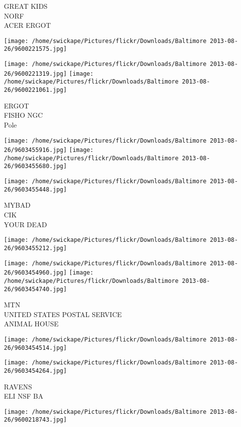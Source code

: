 \documentclass[10pt,letterpaper]{article}
\begin{document}
GREAT KIDS\\
NORF\\
ACER ERGOT
\pagebreak

\texttt{[image: /home/swickape/Pictures/flickr/Downloads/Baltimore 2013-08-26/9600221575.jpg]}

\vspace{0.25in}
\texttt{[image: /home/swickape/Pictures/flickr/Downloads/Baltimore 2013-08-26/9600221319.jpg]}
\texttt{[image: /home/swickape/Pictures/flickr/Downloads/Baltimore 2013-08-26/9600221061.jpg]}

ERGOT\\
FISHO NGC\\
Pole
\pagebreak

\texttt{[image: /home/swickape/Pictures/flickr/Downloads/Baltimore 2013-08-26/9603455916.jpg]}
\texttt{[image: /home/swickape/Pictures/flickr/Downloads/Baltimore 2013-08-26/9603455680.jpg]}

\texttt{[image: /home/swickape/Pictures/flickr/Downloads/Baltimore 2013-08-26/9603455448.jpg]}

MYBAD\\
CIK\\
YOUR DEAD
\pagebreak

\texttt{[image: /home/swickape/Pictures/flickr/Downloads/Baltimore 2013-08-26/9603455212.jpg]}

\vspace{0.25in}
\texttt{[image: /home/swickape/Pictures/flickr/Downloads/Baltimore 2013-08-26/9603454960.jpg]}
\texttt{[image: /home/swickape/Pictures/flickr/Downloads/Baltimore 2013-08-26/9603454740.jpg]}

MTN\\
UNITED STATES POSTAL SERVICE\\
ANIMAL HOUSE
\pagebreak

\texttt{[image: /home/swickape/Pictures/flickr/Downloads/Baltimore 2013-08-26/9603454514.jpg]}

\vspace{0.25in}
\texttt{[image: /home/swickape/Pictures/flickr/Downloads/Baltimore 2013-08-26/9603454264.jpg]}

RAVENS\\
ELI NSF BA
\pagebreak

\texttt{[image: /home/swickape/Pictures/flickr/Downloads/Baltimore 2013-08-26/9600218743.jpg]}
\end{document}

